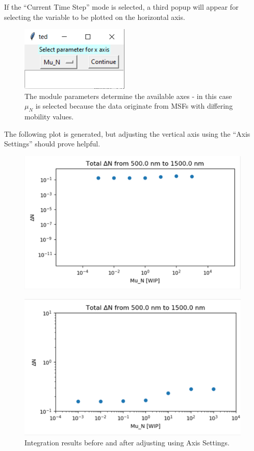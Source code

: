 \documentclass[11pt,letterpaper,titlepage]{article}
\begin{document}
		\par If the “Current Time Step” mode is selected, a third popup will appear for selecting the variable to be plotted on the horizontal axis.
		
		\begin{figure}[H]
			\label{fig:integration_xaxis_example}
			\centering
			\includegraphics{"integration_xaxis_example"}
			\caption{The module parameters determine the available axes - in this case $\mu_{N}$ is selected because the data originate from MSFs with differing mobility values.}
		\end{figure}
	
		\par The following plot is generated, but adjusting the vertical axis using the “Axis Settings” should prove helpful.
		
		\begin{figure}[H]
			\label{fig:integration_result}
			\centering
			\includegraphics{"integration_result"}
		\end{figure}
	
		\begin{figure}[H]
			\label{fig:integration_result_adj}
			\centering
			\includegraphics{"integration_result_adj"}
			\caption{Integration results before and after adjusting using Axis Settings.}
		\end{figure}
	
\end{document}
